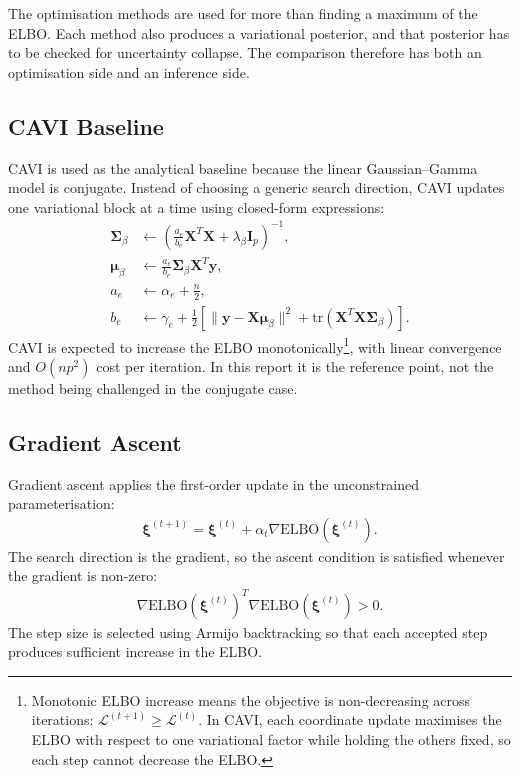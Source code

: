 \documentclass[11pt,a4paper]{article}
\newcommand{\ELBO}{\text{ELBO}}
\newcommand{\tr}{\text{tr}}
\begin{document}
The optimisation methods are used for more than finding a maximum of the ELBO. Each method also produces a variational posterior, and that posterior has to be checked for uncertainty collapse. The comparison therefore has both an optimisation side and an inference side.

\subsection{CAVI Baseline}

CAVI is used as the analytical baseline because the linear Gaussian--Gamma model is conjugate. Instead of choosing a generic search direction, CAVI updates one variational block at a time using closed-form expressions:
\begin{align}
\bm{\Sigma}_\beta &\leftarrow \left(\frac{a_e}{b_e} \bm{X}^T\bm{X} + \lambda_\beta \bm{I}_p\right)^{-1},\\
\bm{\mu}_\beta &\leftarrow \frac{a_e}{b_e} \bm{\Sigma}_\beta \bm{X}^T\bm{y},\\
a_e &\leftarrow \alpha_e + \frac{n}{2},\\
b_e &\leftarrow \gamma_e + \frac{1}{2}\left[\|\bm{y} - \bm{X}\bm{\mu}_\beta\|^2 + \tr(\bm{X}^T\bm{X}\bm{\Sigma}_\beta)\right].
\end{align}
CAVI is expected to increase the ELBO monotonically\footnote{Monotonic ELBO increase means the objective is non-decreasing across iterations: $\mathcal{L}^{(t+1)} \geq \mathcal{L}^{(t)}$. In CAVI, each coordinate update maximises the ELBO with respect to one variational factor while holding the others fixed, so each step cannot decrease the ELBO.}, with linear convergence and $O(np^2)$ cost per iteration. In this report it is the reference point, not the method being challenged in the conjugate case.

\subsection{Gradient Ascent}

Gradient ascent applies the first-order update in the unconstrained parameterisation:
\begin{align}
\bm{\xi}^{(t+1)} = \bm{\xi}^{(t)} + \alpha_t \nabla\ELBO(\bm{\xi}^{(t)}).
\end{align}
The search direction is the gradient, so the ascent condition is satisfied whenever the gradient is non-zero:
\begin{align}
\nabla\ELBO(\bm{\xi}^{(t)})^T \nabla\ELBO(\bm{\xi}^{(t)}) > 0.
\end{align}
The step size is selected using Armijo backtracking so that each accepted step produces sufficient increase in the ELBO.
\end{document}
